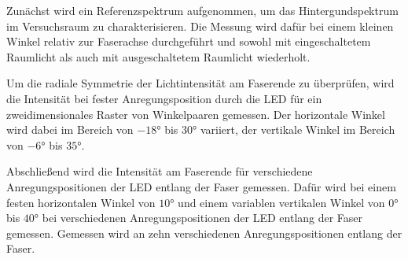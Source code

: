 Zunächst wird ein Referenzspektrum aufgenommen, um das Hintergundspektrum im Versuchsraum zu charakterisieren.
Die Messung wird dafür bei einem kleinen Winkel relativ zur Faserachse durchgeführt und sowohl mit eingeschaltetem Raumlicht als auch mit ausgeschaltetem Raumlicht wiederholt. 

Um die radiale Symmetrie der Lichtintensität am Faserende zu überprüfen, 
wird die Intensität bei fester Anregungsposition durch die LED für ein zweidimensionales Raster von Winkelpaaren gemessen. 
Der horizontale Winkel wird dabei im Bereich von $-18°$ bis $30°$ variiert,
der vertikale Winkel im Bereich von $-6°$ bis $35°$.

Abschließend wird die Intensität am Faserende für verschiedene Anregungspositionen der LED entlang der Faser gemessen.
Dafür wird bei einem festen horizontalen Winkel von $10°$ 
und einem variablen vertikalen Winkel von $0°$ bis $40°$ bei verschiedenen Anregungspositionen der LED entlang der Faser gemessen.
Gemessen wird an zehn verschiedenen Anregungspositionen entlang der Faser.